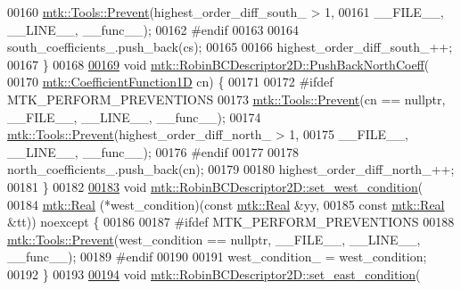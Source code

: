 \begin{DoxyCode}
00160   \hyperlink{classmtk_1_1Tools_a332324c6f25e66be9dff48c5987a3b9f}{mtk::Tools::Prevent}(highest\_order\_diff\_south\_ > 1,
00161                       \_\_FILE\_\_, \_\_LINE\_\_, \_\_func\_\_);
00162 \textcolor{preprocessor}{  #endif}
00163 
00164   south\_coefficients\_.push\_back(cs);
00165 
00166   highest\_order\_diff\_south\_++;
00167 \}
00168 
\hypertarget{mtk__robin__bc__descriptor__2d_8cc_source_l00169}{}\hyperlink{classmtk_1_1RobinBCDescriptor2D_abc6e299516af5d1c5c2d04797875b446}{00169} \textcolor{keywordtype}{void} \hyperlink{classmtk_1_1RobinBCDescriptor2D_abc6e299516af5d1c5c2d04797875b446}{mtk::RobinBCDescriptor2D::PushBackNorthCoeff}(
00170     \hyperlink{group__c07-mim__ops_gaa79593eeb6676d6011db339e01983909}{mtk::CoefficientFunction1D} cn) \{
00171 
00172 \textcolor{preprocessor}{  #ifdef MTK\_PERFORM\_PREVENTIONS}
00173   \hyperlink{classmtk_1_1Tools_a332324c6f25e66be9dff48c5987a3b9f}{mtk::Tools::Prevent}(cn == \textcolor{keyword}{nullptr}, \_\_FILE\_\_, \_\_LINE\_\_, \_\_func\_\_);
00174   \hyperlink{classmtk_1_1Tools_a332324c6f25e66be9dff48c5987a3b9f}{mtk::Tools::Prevent}(highest\_order\_diff\_north\_ > 1,
00175                       \_\_FILE\_\_, \_\_LINE\_\_, \_\_func\_\_);
00176 \textcolor{preprocessor}{  #endif}
00177 
00178   north\_coefficients\_.push\_back(cn);
00179 
00180   highest\_order\_diff\_north\_++;
00181 \}
00182 
\hypertarget{mtk__robin__bc__descriptor__2d_8cc_source_l00183}{}\hyperlink{classmtk_1_1RobinBCDescriptor2D_aeaff87510dc1773effc0b5429579de23}{00183} \textcolor{keywordtype}{void} \hyperlink{classmtk_1_1RobinBCDescriptor2D_aeaff87510dc1773effc0b5429579de23}{mtk::RobinBCDescriptor2D::set\_west\_condition}(
00184     \hyperlink{group__c01-roots_gac080bbbf5cbb5502c9f00405f894857d}{mtk::Real} (*west\_condition)(\textcolor{keyword}{const} \hyperlink{group__c01-roots_gac080bbbf5cbb5502c9f00405f894857d}{mtk::Real} &yy,
00185                                 \textcolor{keyword}{const} \hyperlink{group__c01-roots_gac080bbbf5cbb5502c9f00405f894857d}{mtk::Real} &tt)) noexcept \{
00186 
00187 \textcolor{preprocessor}{  #ifdef MTK\_PERFORM\_PREVENTIONS}
00188   \hyperlink{classmtk_1_1Tools_a332324c6f25e66be9dff48c5987a3b9f}{mtk::Tools::Prevent}(west\_condition == \textcolor{keyword}{nullptr}, \_\_FILE\_\_, \_\_LINE\_\_, \_\_func\_\_);
00189 \textcolor{preprocessor}{  #endif}
00190 
00191   west\_condition\_ = west\_condition;
00192 \}
00193 
\hypertarget{mtk__robin__bc__descriptor__2d_8cc_source_l00194}{}\hyperlink{classmtk_1_1RobinBCDescriptor2D_a94570f6e741bb00038c4bf81842d226c}{00194} \textcolor{keywordtype}{void} \hyperlink{classmtk_1_1RobinBCDescriptor2D_a94570f6e741bb00038c4bf81842d226c}{mtk::RobinBCDescriptor2D::set\_east\_condition}(

\end{DoxyCode}
